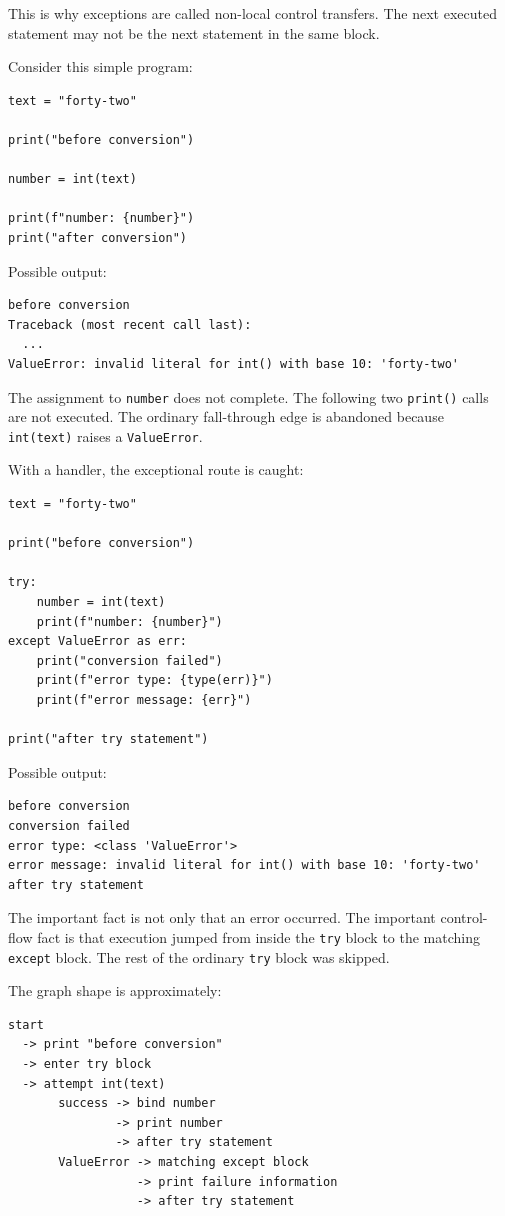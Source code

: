This is why exceptions are called non-local control transfers. The next executed statement may not be the next statement in the same block.

Consider this simple program:

\begin{verbatim}
text = "forty-two"

print("before conversion")

number = int(text)

print(f"number: {number}")
print("after conversion")
\end{verbatim}

Possible output:

\begin{verbatim}
before conversion
Traceback (most recent call last):
  ...
ValueError: invalid literal for int() with base 10: 'forty-two'
\end{verbatim}

The assignment to \texttt{number} does not complete. The following two \texttt{print()} calls are not executed. The ordinary fall-through edge is abandoned because \texttt{int(text)} raises a \texttt{ValueError}.

With a handler, the exceptional route is caught:

\begin{verbatim}
text = "forty-two"

print("before conversion")

try:
    number = int(text)
    print(f"number: {number}")
except ValueError as err:
    print("conversion failed")
    print(f"error type: {type(err)}")
    print(f"error message: {err}")

print("after try statement")
\end{verbatim}

Possible output:

\begin{verbatim}
before conversion
conversion failed
error type: <class 'ValueError'>
error message: invalid literal for int() with base 10: 'forty-two'
after try statement
\end{verbatim}

The important fact is not only that an error occurred. The important control-flow fact is that execution jumped from inside the \texttt{try} block to the matching \texttt{except} block. The rest of the ordinary \texttt{try} block was skipped.

The graph shape is approximately:

\begin{verbatim}
start
  -> print "before conversion"
  -> enter try block
  -> attempt int(text)
       success -> bind number
               -> print number
               -> after try statement
       ValueError -> matching except block
                  -> print failure information
                  -> after try statement
\end{verbatim}

